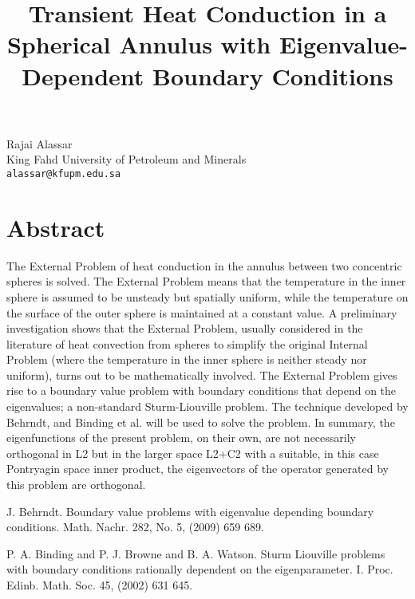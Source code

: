 \title{Transient Heat Conduction in a Spherical Annulus with Eigenvalue-Dependent Boundary Conditions}
 \author{} \institute{}
\maketitle
\begin{center}
{\large Rajai Alassar}\\
King Fahd University of Petroleum and Minerals\\
{\tt alassar@kfupm.edu.sa}

\end{center}

\section*{Abstract}

The External Problem of heat conduction in the annulus between two concentric spheres is solved. The External Problem means that the temperature in the inner sphere is assumed to be unsteady but spatially uniform, while the temperature on the surface of the outer sphere is maintained at a constant value. A preliminary investigation shows that the External Problem, usually considered in the literature of heat convection from spheres to simplify the original Internal Problem (where the temperature in the inner sphere is neither steady nor uniform), turns out to be mathematically involved. The External Problem gives rise to a boundary value problem with boundary conditions that depend on the eigenvalues; a non-standard Sturm-Liouville problem. The technique developed by Behrndt, and Binding et al. will be used to solve the problem. In summary, the eigenfunctions of the present problem, on their own, are not necessarily orthogonal in L2 but in the larger space L2+C2 with a suitable, in this case Pontryagin space inner product, the eigenvectors of the operator generated by this problem are orthogonal.


\begin{thebibliography}{10}

{\sc J. Behrndt}. {Boundary value problems with eigenvalue depending boundary conditions}. Math. Nachr. 282, No. 5, (2009) 659   689.



{\sc P. A. Binding and P. J. Browne and B. A. Watson}. {Sturm Liouville problems with boundary conditions rationally dependent on the eigenparameter}. I. Proc. Edinb. Math. Soc. 45, (2002) 631  645.

\end{thebibliography}
